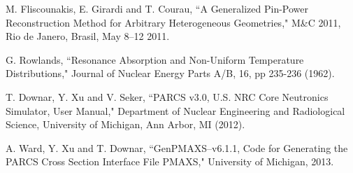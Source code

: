 \begin{thebibliography}{99}
M. Fliscounakis, E. Girardi and T. Courau, ``A Generalized Pin-Power Reconstruction Method for
Arbitrary Heterogeneous Geometries," M\&C 2011, Rio de Janero, Brasil, May 8--12 2011.

G. Rowlands, ``Resonance Absorption and Non-Uniform Temperature Distributions," Journal of
Nuclear Energy Parts A/B, 16, pp 235-236 (1962).

T. Downar, Y. Xu and V. Seker, ``PARCS v3.0, U.S. NRC Core Neutronics Simulator, User Manual," Department of Nuclear Engineering and Radiological Science, University of Michigan, Ann Arbor, MI (2012).

A. Ward, Y. Xu and T. Downar, ``GenPMAXS--v6.1.1, Code for Generating the PARCS Cross Section Interface File PMAXS," University of Michigan, 2013.

\end{thebibliography}
